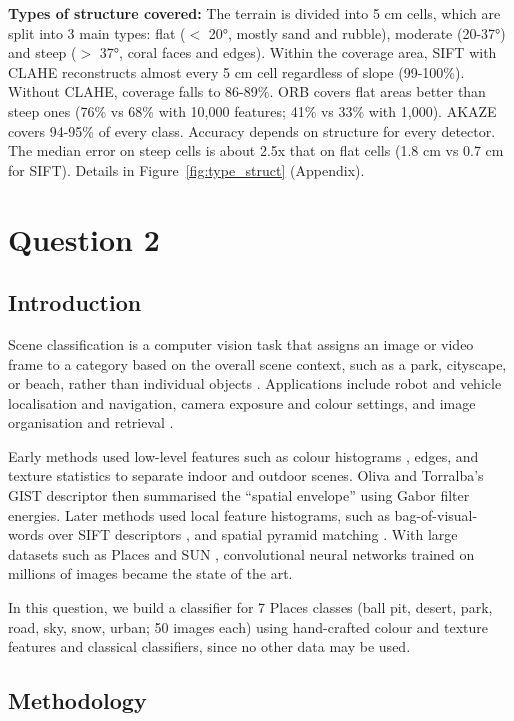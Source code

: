 \documentclass[12pt]{article}
\begin{document}
\textbf{Types of structure covered: }The terrain is divided into 5 cm cells, which are split into 3 main types: flat (\(<\) 20°, mostly sand and rubble), moderate (20-37°) and steep (\(>\) 37°, coral faces and edges). Within the coverage area, SIFT with CLAHE reconstructs almost every 5 cm cell regardless of slope (99-100\%). Without CLAHE, coverage falls to 86-89\%. ORB covers flat areas better than steep ones (76\% vs 68\% with 10,000 features; 41\% vs 33\% with 1,000). AKAZE covers 94-95\% of every class. Accuracy depends on structure for every detector. The median error on steep cells is about 2.5x that on flat cells (1.8 cm vs 0.7 cm for SIFT). Details in Figure~\ref{fig:type_struct} (Appendix).

\newpage
\section{Question 2}
\subsection{Introduction}
Scene classification is a computer vision task that assigns an image or video frame to a category based on the overall scene context, such as a park, cityscape, or beach, rather than individual objects \cite{zhou2018places, torralba2003context}. Applications include robot and vehicle localisation and navigation, camera exposure and colour settings, and image organisation and retrieval \cite{zhou2018places}.

Early methods used low-level features such as colour histograms \cite{swain1991color}, edges, and texture statistics to separate indoor and outdoor scenes. Oliva and Torralba's GIST descriptor \cite{oliva2001modeling} then summarised the ``spatial envelope'' using Gabor filter energies. Later methods used local feature histograms, such as bag-of-visual-words over SIFT descriptors \cite{fei2005bayesian}, and spatial pyramid matching \cite{lazebnik2006spatial}. With large datasets such as Places \cite{zhou2018places} and SUN \cite{xiao2010sun}, convolutional neural networks trained on millions of images became the state of the art.

In this question, we build a classifier for 7 Places classes (ball pit, desert, park, road, sky, snow, urban; 50 images each) using hand-crafted colour and texture features and classical classifiers, since no other data may be used.

\subsection{Methodology}
\end{document}
